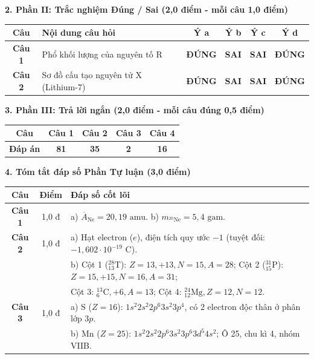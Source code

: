 \documentclass[11pt,a4paper]{article}
\begin{document}
\vspace{2pt}
\noindent
\textbf{\color{mainGreen}2. Phần II: Trắc nghiệm Đúng / Sai (2,0 điểm - mỗi câu 1,0 điểm)}
\begin{center}
\renewcommand{\arraystretch}{1.2}
\begin{tabular}{|c|l|c|c|c|c|}
\hline
\rowcolor{tableGreen}
\textbf{Câu} & \textbf{Nội dung câu hỏi} & \textbf{Ý a} & \textbf{Ý b} & \textbf{Ý c} & \textbf{Ý d} \\
\hline
\textbf{Câu 1} & Phổ khối lượng của nguyên tố R & \textbf{\color{hfRed}ĐÚNG} & \textbf{SAI} & \textbf{SAI} & \textbf{\color{hfRed}ĐÚNG} \\
\hline
\textbf{Câu 2} & Sơ đồ cấu tạo nguyên tử X (Lithium-7) & \textbf{\color{hfRed}ĐÚNG} & \textbf{SAI} & \textbf{SAI} & \textbf{\color{hfRed}ĐÚNG} \\
\hline
\end{tabular}
\end{center}

\vspace{2pt}
\noindent
\textbf{\color{mainGreen}3. Phần III: Trả lời ngắn (2,0 điểm - mỗi câu đúng 0,5 điểm)}
\begin{center}
\renewcommand{\arraystretch}{1.2}
\begin{tabular}{|c|c|c|c|c|}
\hline
\rowcolor{tableGreen}
\textbf{Câu} & \textbf{Câu 1} & \textbf{Câu 2} & \textbf{Câu 3} & \textbf{Câu 4} \\
\hline
\textbf{Đáp án} & \textbf{\color{hfRed}81} & \textbf{\color{hfRed}35} & \textbf{\color{hfRed}2} & \textbf{\color{hfRed}16} \\
\hline
\end{tabular}
\end{center}

\vspace{2pt}
\noindent
\textbf{\color{mainGreen}4. Tóm tắt đáp số Phần Tự luận (3,0 điểm)}
\begin{center}
\renewcommand{\arraystretch}{1.2}
\begin{tabular}{|c|c|p{11.5cm}|}
\hline
\rowcolor{tableGreen}
\textbf{Câu} & \textbf{Điểm} & \textbf{Đáp số cốt lõi} \\
\hline
\textbf{Câu 1} & 1,0 đ & a) $\overline{A}_{\text{Ne}} = 20,19\text{ amu}$. b) $m_{^{20}\text{Ne}} = 5,4\text{ gam}$. \\
\hline
\textbf{Câu 2} & 1,0 đ & a) Hạt electron ($e$), điện tích quy ước $-1$ (tuyệt đối: $-1,602\cdot 10^{-19}\text{ C}$). \\
& & b) Cột 1 ($^{28}_{13}\text{T}$): $Z=13, +13, N=15, A=28$; Cột 2 ($^{31}_{15}\text{P}$): $Z=15, +15, N=16, A=31$; \\
& & Cột 3: $^{13}_{6}\text{C}, +6, A=13$; Cột 4: $^{24}_{12}\text{Mg}, Z=12, N=12$. \\
\hline
\textbf{Câu 3} & 1,0 đ & a) S ($Z=16$): $1s^2 2s^2 2p^6 3s^2 3p^4$, có 2 electron độc thân ở phân lớp $3p$. \\
& & b) Mn ($Z=25$): $1s^2 2s^2 2p^6 3s^2 3p^6 3d^5 4s^2$; Ô 25, chu kì 4, nhóm VIIB. \\
\hline
\end{tabular}
\end{center}
\end{document}
